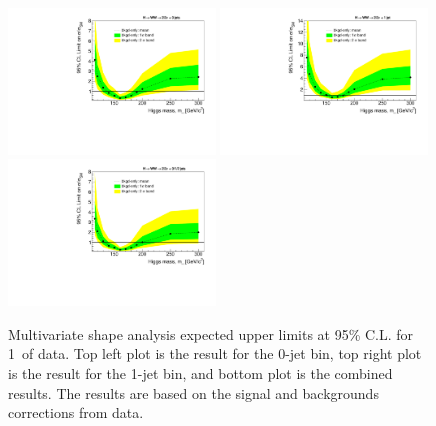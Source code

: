 \begin{figure}[!htbp]
\begin{center}
   \includegraphics[width=0.49\textwidth]{figures/limits_0j_1000pb_datalike_shape_1.pdf}
   \includegraphics[width=0.49\textwidth]{figures/limits_1j_1000pb_datalike_shape_1.pdf}
   \includegraphics[width=0.49\textwidth]{figures/limits_nj_1000pb_datalike_shape_1.pdf}
   \caption{Multivariate shape analysis expected upper limits at 95\% C.L. for 1\ifb\ of data. Top left plot 
   is the result for the 0-jet bin, top right plot is the result for the 1-jet bin, and 
   bottom plot is the combined results. The results 
   are based on the signal and backgrounds corrections from data.}
   \label{fig:mvashape_uls_datalike}
\end{center}
\end{figure}

